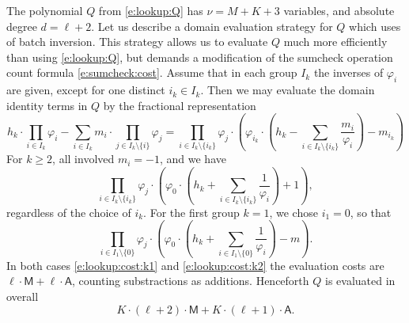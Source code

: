 \documentclass[11pt]{article}
\theoremstyle{definition}
\theoremstyle{definition}
\begin{document}
The polynomial $Q$ from \eqref{e:lookup:Q} has $\nu= M + K + 3$ variables, and absolute degree $d = \ell + 2$.
Let us describe a domain evaluation strategy for $Q$ which uses of batch inversion. 
This strategy allows us to evaluate $Q$ much more efficiently than using \eqref{e:lookup:Q}, but demands a modification of the sumcheck operation count formula \eqref{e:sumcheck:cost}.
Assume that in each group $I_k$ the inverses of $\varphi_i$ are given, except for one distinct $i_k\in I_k$.
Then we may evaluate the domain identity terms in $Q$ by the fractional representation
\begin{equation*}
h_k \cdot \prod_{i\in I_k} \varphi_i - \sum_{i\in I_k} m_i\cdot \prod_{j\in I_k\setminus\{i\}} \varphi_j = 
 \prod_{i\in I_k\setminus\{i_k\}} \varphi_j \cdot \left( \varphi_{i_k} \cdot \left( h_k - \sum_{i\in I_k\setminus\{i_k\}} \frac{m_i}{\varphi_i}\right) - m_{i_k} \right)
\end{equation*}
For $k\geq 2$, all involved $m_i = -1$, and we have 
\begin{equation}
\label{e:lookup:cost:k2}
 \prod_{i\in I_k\setminus\{i_k\}} \varphi_j \cdot \left( \varphi_0 \cdot \left( h_k + \sum_{i\in I_k\setminus\{i_k\}} \frac{1}{\varphi_i}\right) + 1 \right),
\end{equation}
regardless of the choice of $i_k$. 
For the first group $k=1$, we chose $i_1 = 0$, so that 
\begin{equation}
\label{e:lookup:cost:k1}
\prod_{i\in I_1\setminus\{0\}} \varphi_j \cdot \left( \varphi_0 \cdot \left( h_k + \sum_{i\in I_1\setminus\{0\}} \frac{1}{\varphi_i}\right) - m \right).
\end{equation}
In both cases \eqref{e:lookup:cost:k1} and \eqref{e:lookup:cost:k2} the evaluation costs are $\ell\cdot \mathsf M + \ell \cdot\mathsf A$, counting substractions as additions. 
Henceforth $Q$ is evaluated in overall
\begin{equation}
K \cdot (\ell  +2) \cdot \mathsf M + K\cdot (\ell+1)\cdot \mathsf A.
\end{equation}
\end{document}
